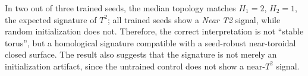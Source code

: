 In two out of three trained seeds, the median topology matches $H_1=2$,
$H_2=1$, the expected signature of $T^2$; all trained seeds show a \emph{Near
T2} signal, while random initialization does not. Therefore, the correct
interpretation is not ``stable torus'', but a homological signature compatible
with a seed-robust near-toroidal closed surface. The result also suggests that
the signature is not merely an initialization artifact, since the untrained
control does not show a near-$T^2$ signal.
